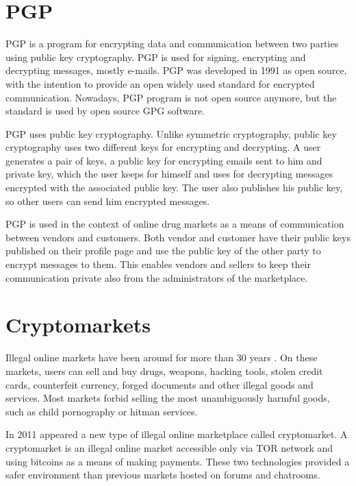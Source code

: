 \documentclass[
  digital, %
  table,   %
  lof,     %
  lot,     %
  oneside
]{fithesis3}
\begin{document}
\section{PGP}

PGP \parencite{Zimmermann:1995:OPU:202735} is a program for encrypting data
and communication between two parties using public key cryptography.
PGP is used for signing, encrypting and decrypting messages, mostly e-mails.
PGP was developed in 1991 as open source, with the intention 
to provide an open widely used standard for encrypted communication.
Nowadays, PGP program is not open source anymore, but the standard is used by open source GPG software.

PGP uses public key cryptography. Unlike symmetric cryptography, public key cryptography
uses two different keys for encrypting and decrypting.
A user generates a pair of keys, a public key for encrypting emails sent to him and private key, which the user
 keeps for himself and uses for decrypting messages encrypted with the associated public key.
 The user also publishes his public key, so other users can send him encrypted messages.

PGP is used in the context of online drug markets as a means of communication between vendors and customers.
Both vendor and customer have their public keys published on their profile page and use the public key of the other
party to encrypt messages to them. This enables vendors and sellers to keep their communication private also from the administrators of the marketplace.

\section{Cryptomarkets}

Illegal online markets have been around for more than 30 years \parencite{motoyama2011analysis}.
On these markets, users can sell and buy drugs, weapons, hacking tools, stolen credit cards,
counterfeit currency, forged documents and other illegal goods and services.
Most markets forbid selling the most unambiguously harmful goods, such as child pornography or hitman services.
 
In 2011 appeared a new type of illegal online marketplace called cryptomarket. 
A cryptomarket is an illegal online market accessible only via TOR network and using bitcoins
as a means of making payments. These two technologies provided a safer environment
than previous markets hosted on forums and chatrooms.
\end{document}
